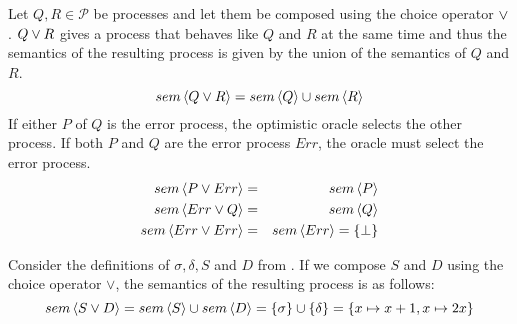 \begin{definition}
\label{def:sem_choice}
Let $Q, R \in \mathcal{P}$ be processes and let them be composed using the choice operator $\vee$. $Q \vee R$ gives a process that behaves like $Q$ and $R$ at the same time and thus the semantics of the resulting process is given by the union of the semantics of $Q$ and $R$.
  \begin{equation}
    \label{eqn:sem_choice}
    sem \left\langle Q \vee R \right\rangle = sem \left\langle Q \right\rangle \cup sem \left\langle R \right\rangle
  \end{equation}
If either $P$ of $Q$ is the error process, the optimistic oracle selects the other process. If both $P$ and $Q$ are the error process $Err$, the oracle must select the error process.
  \begin{eqnarray}
    sem \left\langle P \vee Err \right\rangle & = & sem \left\langle P \right\rangle \\
    sem \left\langle Err \vee Q \right\rangle & = & sem \left\langle Q \right\rangle \\
    sem \left\langle Err \vee Err \right\rangle & = & sem \left\langle Err \right\rangle = \left\{ \bot \right\}
  \end{eqnarray}
  \hfill\qedsymbol
\end{definition}

\begin{example}
\label{exp:sem_chice}
Consider the definitions of $\sigma, \delta, S$ and $D$ from . If we compose $S$ and $D$ using the choice operator $\vee$, the semantics of the resulting process is as follows:
  \begin{equation}
    sem \left\langle S \vee D \right\rangle = sem \left\langle S \right\rangle \cup sem \left\langle D \right\rangle = \left\{ \sigma \right\} \cup \left\{ \delta \right\} = \left\{ x \mapsto x+1, x \mapsto 2x \right\}
  \end{equation}
  \hfill\qedsymbol
\end{example}


